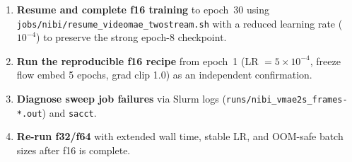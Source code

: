 \documentclass[11pt,a4paper]{article}
\begin{document}
\begin{enumerate}[leftmargin=*]
  \item \textbf{Resume and complete f16 training} to epoch~30 using
        \texttt{jobs/nibi/resume\_videomae\_twostream.sh} with a reduced learning rate
        ($10^{-4}$) to preserve the strong epoch-8 checkpoint.
  \item \textbf{Run the reproducible f16 recipe} from epoch~1
        (LR $= 5 \times 10^{-4}$, freeze flow embed 5 epochs, grad clip 1.0) as an
        independent confirmation.
  \item \textbf{Diagnose sweep job failures} via Slurm logs
        (\texttt{runs/nibi\_vmae2s\_frames-*.out}) and \texttt{sacct}.
  \item \textbf{Re-run f32/f64} with extended wall time, stable LR, and OOM-safe batch
        sizes after f16 is complete.
  
\end{enumerate}
\end{document}
